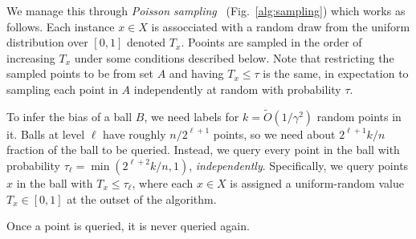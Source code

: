 \documentclass[twoside]{article}
\begin{document}
We manage this through \emph{Poisson
  sampling}~\cite{ghosh2002sampling} (Fig.~\ref{alg:sampling}) which
works as follows. Each instance $x \in X$ is assocciated with a random
draw from the uniform distribution over $[0,1]$ denoted $T_x$.
Pooints are sampled in the order of increasing $T_x$ under some
conditions described below.  Note that restricting the sampled points
to be from set $A$ and having $T_x \leq \tau$ is the same, in
expectation to sampling each point in $A$ independently at random with
probability $\tau$.

To infer the bias of a ball $B$, we need labels for
$k = \tilde{O}(1/\gamma^2)$ random points in it. Balls at level $\ell$
have roughly $n/2^{\ell+1}$ points, so we need about $2^{\ell+1} k/n$
fraction of the ball to be queried. Instead, we query every point in
the ball with probability $\tau_\ell = \min(2^{\ell+2}k/n, 1)$,
\emph{independently}. Specifically, we query points $x$ in the ball
with $T_x \leq \tau_\ell$, where each $x \in X$ is assigned a
uniform-random value $T_x \in [0,1]$ at the outset of the algorithm.

Once a point is queried, it is never queried again.

\end{document}

